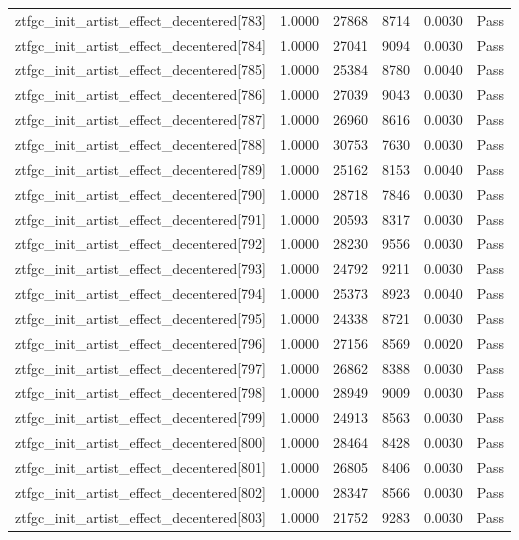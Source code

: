 \begin{table}[htbp]
\begin{tabular}{llrrll}
ztfgc\_init\_artist\_effect\_decentered[783] & 1.0000 & 27868 & 8714 & 0.0030 & Pass \\
ztfgc\_init\_artist\_effect\_decentered[784] & 1.0000 & 27041 & 9094 & 0.0030 & Pass \\
ztfgc\_init\_artist\_effect\_decentered[785] & 1.0000 & 25384 & 8780 & 0.0040 & Pass \\
ztfgc\_init\_artist\_effect\_decentered[786] & 1.0000 & 27039 & 9043 & 0.0030 & Pass \\
ztfgc\_init\_artist\_effect\_decentered[787] & 1.0000 & 26960 & 8616 & 0.0030 & Pass \\
ztfgc\_init\_artist\_effect\_decentered[788] & 1.0000 & 30753 & 7630 & 0.0030 & Pass \\
ztfgc\_init\_artist\_effect\_decentered[789] & 1.0000 & 25162 & 8153 & 0.0040 & Pass \\
ztfgc\_init\_artist\_effect\_decentered[790] & 1.0000 & 28718 & 7846 & 0.0030 & Pass \\
ztfgc\_init\_artist\_effect\_decentered[791] & 1.0000 & 20593 & 8317 & 0.0030 & Pass \\
ztfgc\_init\_artist\_effect\_decentered[792] & 1.0000 & 28230 & 9556 & 0.0030 & Pass \\
ztfgc\_init\_artist\_effect\_decentered[793] & 1.0000 & 24792 & 9211 & 0.0030 & Pass \\
ztfgc\_init\_artist\_effect\_decentered[794] & 1.0000 & 25373 & 8923 & 0.0040 & Pass \\
ztfgc\_init\_artist\_effect\_decentered[795] & 1.0000 & 24338 & 8721 & 0.0030 & Pass \\
ztfgc\_init\_artist\_effect\_decentered[796] & 1.0000 & 27156 & 8569 & 0.0020 & Pass \\
ztfgc\_init\_artist\_effect\_decentered[797] & 1.0000 & 26862 & 8388 & 0.0030 & Pass \\
ztfgc\_init\_artist\_effect\_decentered[798] & 1.0000 & 28949 & 9009 & 0.0030 & Pass \\
ztfgc\_init\_artist\_effect\_decentered[799] & 1.0000 & 24913 & 8563 & 0.0030 & Pass \\
ztfgc\_init\_artist\_effect\_decentered[800] & 1.0000 & 28464 & 8428 & 0.0030 & Pass \\
ztfgc\_init\_artist\_effect\_decentered[801] & 1.0000 & 26805 & 8406 & 0.0030 & Pass \\
ztfgc\_init\_artist\_effect\_decentered[802] & 1.0000 & 28347 & 8566 & 0.0030 & Pass \\
ztfgc\_init\_artist\_effect\_decentered[803] & 1.0000 & 21752 & 9283 & 0.0030 & Pass \\

\end{tabular}
\end{table}
